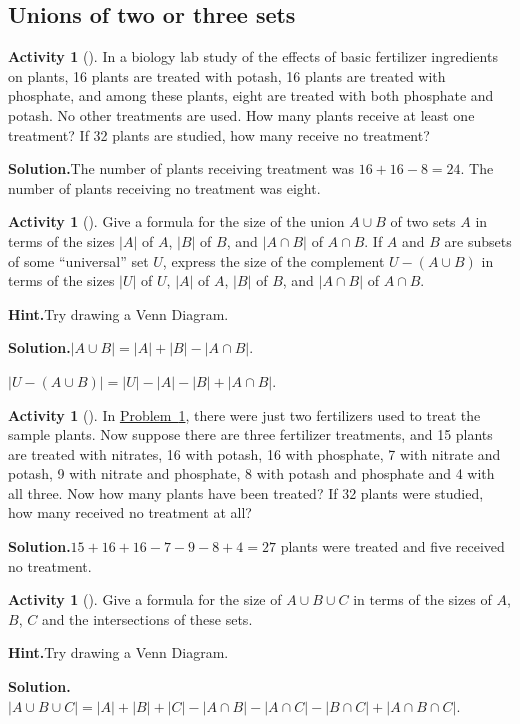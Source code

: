\documentclass[10pt,]{book}
\theoremstyle{plain}
\theoremstyle{definition}
\newtheorem{activity}[project]{Activity}
\numberwithin{equation}{chapter}
\begin{document}
\subsection[{Unions of two or three sets}]{Unions of two or three sets}\label{subsection-51}
\begin{activity}[]\label{fertilizer2}
In a biology lab study of the effects of basic fertilizer ingredients on plants, 16 plants are treated with potash, 16 plants are treated with phosphate, and among these plants, eight are treated with both phosphate and potash. No other treatments are used. How many plants receive at least one treatment? If 32 plants are studied, how many receive no treatment?%
\par\medskip\noindent%
\textbf{Solution.}\quad The number of plants receiving treatment was \(16+16-8 = 24\). The number of plants receiving no treatment was eight.%
\end{activity}
\begin{activity}[]\label{twosetintersection}
Give a formula for the size of the union \(A\cup B\) of two sets \(A\) in terms of the sizes \(|A|\) of \(A\), \(|B|\) of \(B\), and \(|A\cap B|\) of \(A\cap B\). If \(A\) and \(B\) are subsets of some ``universal'' set \(U\), express the size of the complement \(U-(A\cup B)\) in terms of the sizes \(|U|\) of \(U\), \(|A|\) of \(A\), \(|B|\) of \(B\), and \(|A\cap B|\) of \(A\cap B\).%
\par\medskip\noindent%
\textbf{Hint.}\quad Try drawing a Venn Diagram.%
\par\medskip\noindent%
\textbf{Solution.}\quad \(|A\cup B|=|A| + |B| - |A\cap B|\).%
\par
\(|U-(A\cup B)| = |U|-|A|-|B| + |A
\cap B|\).%
\end{activity}
\begin{activity}[]\label{activity-223}
In \hyperref[fertilizer2]{Problem~\ref{fertilizer2}}, there were just two fertilizers used to treat the sample plants. Now suppose there are three fertilizer treatments, and 15 plants are treated with nitrates, 16 with potash, 16 with phosphate, 7 with nitrate and potash, 9 with nitrate and phosphate, 8 with potash and phosphate and 4 with all three. Now how many plants have been treated? If 32 plants were studied, how many received no treatment at all?%
\par\medskip\noindent%
\textbf{Solution.}\quad \(15+16+16-7-9-8+4=27\) plants were treated and five received no treatment.%
\end{activity}
\begin{activity}[]\label{threesetintersection}
Give a formula for the size of \(A\cup B\cup C\) in terms of the sizes of \(A\), \(B\), \(C\) and the intersections of these sets.%
\par\medskip\noindent%
\textbf{Hint.}\quad Try drawing a Venn Diagram.%
\par\medskip\noindent%
\textbf{Solution.}\quad \(|A\cup B\cup C|=|A|+|B|+|C|-|A\cap B|- |A\cap C| - |B\cap
C| +|A\cap B\cap C|\).%
\end{activity}
\typeout{************************************************}
\typeout{************************************************}
\end{document}
